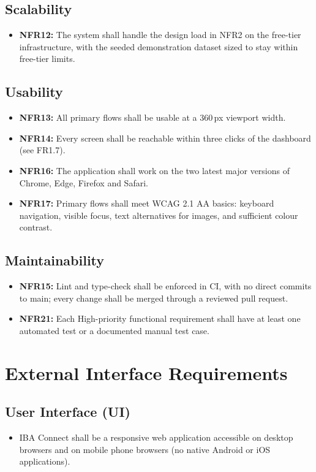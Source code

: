 \documentclass[10pt,a4paper]{article}
\begin{document}
\subsection{Scalability}
\begin{itemize}
\item \textbf{NFR12:} The system shall handle the design load in NFR2 on the free-tier infrastructure, with the seeded demonstration dataset sized to stay within free-tier limits.
\end{itemize}
\subsection{Usability}
\begin{itemize}
\item \textbf{NFR13:} All primary flows shall be usable at a 360\,px viewport width.
\item \textbf{NFR14:} Every screen shall be reachable within three clicks of the dashboard (see FR1.7).
\item \textbf{NFR16:} The application shall work on the two latest major versions of Chrome, Edge, Firefox and Safari.
\item \textbf{NFR17:} Primary flows shall meet WCAG 2.1 AA basics: keyboard navigation, visible focus, text alternatives for images, and sufficient colour contrast.
\end{itemize}
\subsection{Maintainability}
\begin{itemize}
\item \textbf{NFR15:} Lint and type-check shall be enforced in CI, with no direct commits to main; every change shall be merged through a reviewed pull request.
\item \textbf{NFR21:} Each High-priority functional requirement shall have at least one automated test or a documented manual test case.
\end{itemize}

\section{External Interface Requirements}
\subsection{User Interface (UI)}
\begin{itemize}
\item IBA Connect shall be a responsive web application accessible on desktop browsers and on mobile phone browsers (no native Android or iOS applications).
\end{itemize}
\end{document}
